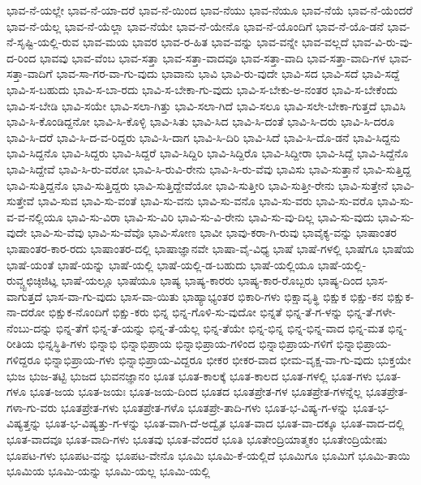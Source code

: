 {ಭಾವ-ನೆ-ಯಲ್ಲೇ
ಭಾವ-ನೆ-ಯಾ-ದರೆ
ಭಾವ-ನೆ-ಯಿಂದ
ಭಾವ-ನೆಯು
ಭಾವ-ನೆಯೂ
ಭಾವ-ನೆಯೆ
ಭಾವ-ನೆ-ಯೆಂದರೆ
ಭಾವ-ನೆ-ಯೆಲ್ಲ
ಭಾವ-ನೆ-ಯೆಲ್ಲಾ
ಭಾವ-ನೆಯೇ
ಭಾವ-ನೆ-ಯೇನೊ
ಭಾವ-ನೆ-ಯೊಂದಿಗೆ
ಭಾವ-ನೆ-ಯೊ-ಡನೆ
ಭಾವ-ನೆ-ಸೃಷ್ಟಿ-ಯಲ್ಲಿ-ರುವ
ಭಾವ-ಮಯ
ಭಾವರ
ಭಾವ-ರ-ಹಿತ
ಭಾವ-ವನ್ನು
ಭಾವ-ವನ್ನೇ
ಭಾವ-ವಲ್ಲದೆ
ಭಾವ-ವಿ-ರು-ವು-ದ-ರಿಂದ
ಭಾವವು
ಭಾವ-ವೆಂಬ
ಭಾವ-ಸತ್ತಾ
ಭಾವ-ಸತ್ತಾ-ವಾದವೂ
ಭಾವ-ಸತ್ತಾ-ವಾದಿ
ಭಾವ-ಸತ್ತಾ-ವಾದಿ-ಗಳ
ಭಾವ-ಸತ್ತಾ-ವಾದಿಗೆ
ಭಾವ-ಸಾ-ಗರ-ವಾ-ಗು-ವುದು
ಭಾವಾನು
ಭಾವಿ
ಭಾವಿ-ರು-ವುದೇ
ಭಾವಿ-ಸದ
ಭಾವಿ-ಸದೆ
ಭಾವಿ-ಸದ್ದೆ
ಭಾವಿ-ಸ-ಬಹುದು
ಭಾವಿ-ಸ-ಬಾ-ರದು
ಭಾವಿ-ಸ-ಬೇಕಾ-ಗು-ವುದು
ಭಾವಿ-ಸ-ಬೇಕು-ಅ-ನಂತರ
ಭಾವಿ-ಸ-ಬೇಕೆಂದು
ಭಾವಿ-ಸ-ಬೇಡಿ
ಭಾವಿ-ಸಯೇ
ಭಾವಿ-ಸಲಾ-ಗಿತ್ತು
ಭಾವಿ-ಸಲಾ-ಗಿದೆ
ಭಾವಿ-ಸಲೂ
ಭಾವಿ-ಸಲೇ-ಬೇಕಾ-ಗುತ್ತದೆ
ಭಾವಿಸಿ
ಭಾವಿ-ಸಿ-ಕೊಂಡಿದ್ದನೋ
ಭಾವಿ-ಸಿ-ಕೊಳ್ಳಿ
ಭಾವಿ-ಸಿತು
ಭಾವಿ-ಸಿದ
ಭಾವಿ-ಸಿ-ದಂತೆ
ಭಾವಿ-ಸಿ-ದರು
ಭಾವಿ-ಸಿ-ದರೂ
ಭಾವಿ-ಸಿ-ದರೆ
ಭಾವಿ-ಸಿ-ದ-ವ-ರಿದ್ದರು
ಭಾವಿ-ಸಿ-ದಾಗ
ಭಾವಿ-ಸಿ-ದಿರಿ
ಭಾವಿ-ಸಿದೆ
ಭಾವಿ-ಸಿ-ದೊ-ಡನೆ
ಭಾವಿ-ಸಿದ್ದನು
ಭಾವಿ-ಸಿದ್ದನೊ
ಭಾವಿ-ಸಿದ್ದರು
ಭಾವಿ-ಸಿದ್ದರೆ
ಭಾವಿ-ಸಿದ್ದಿರಿ
ಭಾವಿ-ಸಿದ್ದಿರೊ
ಭಾವಿ-ಸಿದ್ದೀರಾ
ಭಾವಿ-ಸಿದ್ದೆ
ಭಾವಿ-ಸಿದ್ದೆನೊ
ಭಾವಿ-ಸಿದ್ದೇವೆ
ಭಾವಿ-ಸಿ-ರು-ವರೋ
ಭಾವಿ-ಸಿ-ರುವಿ-ರೇನು
ಭಾವಿ-ಸಿ-ರು-ವೆವು
ಭಾವಿಸು
ಭಾವಿ-ಸುತ್ತಾನೆ
ಭಾವಿ-ಸುತ್ತಿದ್ದ
ಭಾವಿ-ಸುತ್ತಿದ್ದನೊ
ಭಾವಿ-ಸುತ್ತಿದ್ದರು
ಭಾವಿ-ಸುತ್ತಿದ್ದೇವೆಯೋ
ಭಾವಿ-ಸುತ್ತೀರಿ
ಭಾವಿ-ಸುತ್ತೀ-ರೇನು
ಭಾವಿ-ಸುತ್ತೇನೆ
ಭಾವಿ-ಸುತ್ತೇವೆ
ಭಾವಿ-ಸುವ
ಭಾವಿ-ಸು-ವಂತೆ
ಭಾವಿ-ಸು-ವನು
ಭಾವಿ-ಸು-ವನೊ
ಭಾವಿ-ಸು-ವರು
ಭಾವಿ-ಸು-ವರೊ
ಭಾವಿ-ಸು-ವ-ವ-ನಲ್ಲಿಯೂ
ಭಾವಿ-ಸು-ವಿರಾ
ಭಾವಿ-ಸು-ವಿರಿ
ಭಾವಿ-ಸು-ವಿ-ರೇನು
ಭಾವಿ-ಸು-ವು-ದಿಲ್ಲ
ಭಾವಿ-ಸು-ವುದು
ಭಾವಿ-ಸು-ವುದೇ
ಭಾವಿ-ಸು-ವೆವು
ಭಾವಿ-ಸು-ವೆವೊ
ಭಾವಿ-ಸೋಣ
ಭಾವೀ
ಭಾವು-ಕರಾ-ಗಿ-ರುವು
ಭಾವೈಕ್ಯ-ವನ್ನು
ಭಾಷಾಂತರ
ಭಾಷಾಂತರ-ಕಾರ-ರದು
ಭಾಷಾಂತರ-ದಲ್ಲಿ
ಭಾಷಾಜ್ಞಾನವೇ
ಭಾಷಾ-ವೈ-ವಿಧ್ಯ
ಭಾಷೆ
ಭಾಷೆ-ಗಳಲ್ಲಿ
ಭಾಷೆಗೂ
ಭಾಷೆಯ
ಭಾಷೆ-ಯಂತೆ
ಭಾಷೆ-ಯನ್ನು
ಭಾಷೆ-ಯಲ್ಲಿ
ಭಾಷೆ-ಯಲ್ಲಿ-ಡ-ಬಹುದು
ಭಾಷೆ-ಯಲ್ಲಿಯೂ
ಭಾಷೆ-ಯಲ್ಲಿ-ರುವ್ಚ್ಟಛಿಚ್ಠಿಜಿಟ್ಞ
ಭಾಷೆ-ಯಲ್ಲೂ
ಭಾಷೆಯೂ
ಭಾಷ್ಯ
ಭಾಷ್ಯ-ಕಾರರು
ಭಾಷ್ಯ-ಕಾರ-ರೊಬ್ಬರು
ಭಾಷ್ಯ-ದಿಂದ
ಭಾಸ-ವಾಗುತ್ತದೆ
ಭಾಸ-ವಾ-ಗು-ವುದು
ಭಾಸ-ವಾ-ಯಿತು
ಭಾಹ್ಯಾಭ್ಯಂತರ
ಭಿಕಾರಿ-ಗಳು
ಭಿಕ್ಷಾವೃತ್ಥಿ
ಭಿಕ್ಷುಕ
ಭಿಕ್ಷು-ಕನ
ಭಿಕ್ಷುಕ-ನಾ-ದರೋ
ಭಿಕ್ಷುಕ-ನೊಂದಿಗೆ
ಭಿಕ್ಷು-ಕರು
ಭಿನ್ನ
ಭಿನ್ನ-ಗೊಳಿ-ಸು-ವುದೋ
ಭಿನ್ನತೆ
ಭಿನ್ನ-ತೆ-ಗ-ಳನ್ನು
ಭಿನ್ನ-ತೆ-ಗಳೇ-ನೆಂಬು-ದನ್ನು
ಭಿನ್ನ-ತೆಗೆ
ಭಿನ್ನ-ತೆ-ಯನ್ನು
ಭಿನ್ನ-ತೆ-ಯೆಲ್ಲ
ಭಿನ್ನ-ತೆಯೇ
ಭಿನ್ನ-ಭಿನ್ನ
ಭಿನ್ನ-ಭಿನ್ನ-ವಾದ
ಭಿನ್ನ-ಮತ
ಭಿನ್ನ-ರೀತಿಯ
ಭಿನ್ನಸ್ಥಿತಿ-ಗಳು
ಭಿನ್ನಾಭಿ
ಭಿನ್ನಾಭಿಪ್ರಾಯ
ಭಿನ್ನಾಭಿಪ್ರಾಯ-ಗಳಿಂದ
ಭಿನ್ನಾಭಿಪ್ರಾಯ-ಗಳಿಗೆ
ಭಿನ್ನಾಭಿಪ್ರಾಯ-ಗಳಿದ್ದರೂ
ಭಿನ್ನಾಭಿಪ್ರಾಯ-ಗಳು
ಭಿನ್ನಾಭಿಪ್ರಾಯ-ವಿದ್ದರೂ
ಭೀಕರ
ಭೀಕರ-ವಾದ
ಭೀಮ-ವೃಕ್ಷ-ವಾ-ಗು-ವುದು
ಭುಕ್ತಯೇ
ಭುಜ
ಭುಜ-ತಟ್ಟಿ
ಭುಜದ
ಭುವನಜ್ಞಾನಂ
ಭೂತ
ಭೂತ-ಕಾಲಕ್ಕೆ
ಭೂತ-ಕಾಲದ
ಭೂತ-ಗಳಲ್ಲಿ
ಭೂತ-ಗಳು
ಭೂತ-ಗಳೂ
ಭೂತ-ಜಯ
ಭೂತ-ಜಯಃ
ಭೂತ-ಜಯ-ದಿಂದ
ಭೂತದ
ಭೂತಪ್ರೇತ-ಗಳ
ಭೂತಪ್ರೇತ-ಗಳನ್ನೆಲ್ಲ
ಭೂತಪ್ರೇತ-ಗಳಾ-ಗು-ವರು
ಭೂತಪ್ರೇತ-ಗಳು
ಭೂತಪ್ರೇತ-ಗಳೊ
ಭೂತಪ್ರೇ-ತಾದಿ-ಗಳು
ಭೂತ-ಭ-ವಿಷ್ಯ-ಗ-ಳನ್ನು
ಭೂತ-ಭ-ವಿಷ್ಯತ್ತನ್ನು
ಭೂತ-ಭ-ವಿಷ್ಯತ್ತು-ಗ-ಳನ್ನು
ಭೂತ-ವಾಗಿ-ದೆ-ಅದ್ವೈತ
ಭೂತ-ವಾದ
ಭೂತ-ವಾ-ದಕ್ಕೂ
ಭೂತ-ವಾದ-ದಲ್ಲಿ
ಭೂತ-ವಾದವೂ
ಭೂತ-ವಾದಿ-ಗಳು
ಭೂತವು
ಭೂತ-ವೆಂದರೆ
ಭೂತಿ
ಭೂತೇಂದ್ರಿಯಾತ್ಮಕಂ
ಭೂತೇಂದ್ರಿಯೇಷು
ಭೂಪಟ-ಗಳು
ಭೂಪಟ-ವನ್ನು
ಭೂಪಟ-ವೇನೊ
ಭೂಮಿ
ಭೂಮಿ-ಕೆ-ಯಲ್ಲಿದೆ
ಭೂಮಿಗೂ
ಭೂಮಿಗೆ
ಭೂಮಿ-ತಾಯಿ
ಭೂಮಿಯ
ಭೂಮಿ-ಯನ್ನು
ಭೂಮಿ-ಯಲ್ಲ
ಭೂಮಿ-ಯಲ್ಲಿ
}
